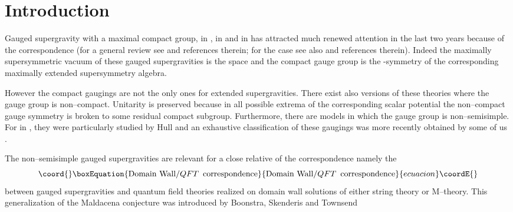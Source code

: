 \documentclass[a4paper,12pt]{article}
\begin{document}
\section{Introduction}
Gauged supergravity with a maximal compact group, \coordHE{} in \coordHE{}
\cite{gunwar,PPV}, \coordHE{} in
\coordHE{} \cite{dewitnicol} and \coordHE{} in \coordHE{} \cite{Pernici:1984xx}
has attracted much renewed attention in the last two
years because of the \coordHE{} correspondence (for a general review
see \cite{Aharony:2000ti} and references therein; for the case \coordHE{} see also
\cite{Gualtieri:1999tu} and references therein). Indeed the
maximally supersymmetric vacuum of these gauged supergravities is the \coordHE{}
space and the compact gauge group \coordHE{} is the
\coordHE{}-symmetry of the corresponding maximally extended supersymmetry algebra.
\par
However the compact gaugings are not the only ones for extended
supergravities. There exist also versions of these theories where the gauge
group  \coordHE{} is non--compact. Unitarity is preserved because
in all possible extrema of the corresponding  scalar potential the
non--compact gauge symmetry is broken to some residual compact subgroup.
Furthermore, there are models in which the gauge group is non--semisimple.
For \coordHE{} in \coordHE{}, they were particularly studied by Hull \cite{hull,hull2}
and an exhaustive classification of these  gaugings
was more recently obtained  by some of us \cite{noi4D}.
\par
The non--semisimple gauged supergravities are  relevant for a close relative of the
\coordHE{} correspondence namely the
\begin{equation}\coord{}\boxEquation{
  \mbox{Domain Wall}/QFT \,\,\, \mbox{correspondence}
\label{domwalqft}
}{
  \mbox{Domain Wall}/QFT \,\,\, \mbox{correspondence}
}{ecuacion}\coordE{}\end{equation}
between gauged supergravities and quantum field theories realized on domain wall
solutions of either string theory or M--theory. This generalization of the Maldacena
conjecture was introduced by Boonstra, Skenderis and Townsend \cite{Boonstra:1999mp}
\end{document}
